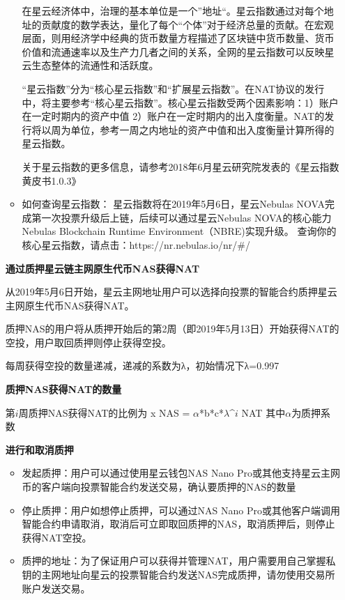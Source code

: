 \begin{enumerate}
\begin{itemize}
	在星云经济体中，治理的基本单位是一个”地址“。星云指数通过对每个地址的贡献度的数学表达，量化了每个“个体”对于经济总量的贡献。在宏观层面，则用经济学中经典的货币数量方程描述了区块链中货币数量、货币价值和流通速率以及生产力几者之间的关系，全网的星云指数可以反映星云生态整体的流通性和活跃度。
	
	“星云指数”分为“核心星云指数”和“扩展星云指数”。在NAT协议的发行中，将主要参考“核心星云指数”。核心星云指数受两个因素影响：1）账户在一定时期内的资产中值 2）账户在一定时期内的出入度衡量。NAT的发行将以周为单位，参考一周之内地址的资产中值和出入度衡量计算所得的星云指数。

	关于星云指数的更多信息，请参考2018年6月星云研究院发表的《星云指数黄皮书1.0.3》

	\item 如何查询星云指数：
	星云指数将在2019年5月6日，星云Nebulas NOVA完成第一次投票升级后上链，后续可以通过星云Nebulas NOVA的核心能力Nebulas Blockchain Runtime Environment（NBRE)实现升级。
查询你的核心星云指数，请点击：https://nr.nebulas.io/nr/#/

\end{itemize}

\textbf{通过质押星云链主网原生代币NAS获得NAT}

	从2019年5月6日开始，星云主网地址用户可以选择向投票的智能合约质押星云主网原生代币NAS获得NAT。

	质押NAS的用户将从质押开始后的第2周（即2019年5月13日）开始获得NAT的空投，用户取回质押则停止获得空投。

	每周获得空投的数量递减，递减的系数为λ，初始情况下λ=0.997

	\textbf{质押NAS获得NAT的数量}
	
		第$i$周质押NAS获得NAT的比例为 x NAS = $α$*b*c*$λ$^$i$ NAT
		其中$α$为质押系数


	\textbf{进行和取消质押}

	\begin{itemize}
		\item 发起质押：用户可以通过使用星云钱包NAS Nano Pro或其他支持星云主网币的客户端向投票智能合约发送交易，确认要质押的NAS的数量
		\item 停止质押：用户如想停止质押，可以通过NAS Nano Pro或其他客户端调用智能合约申请取消，取消后可立即取回质押的NAS，取消质押后，则停止获得NAT空投。
		\item 质押的地址：为了保证用户可以获得并管理NAT，用户需要用自己掌握私钥的主网地址向星云的投票智能合约发送NAS完成质押，请勿使用交易所账户发送交易。
	\end{itemize}


\end{enumerate}
